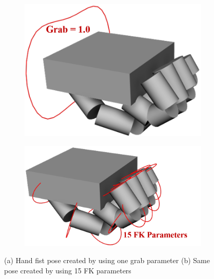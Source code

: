 \begin{figure}[!ht]
    \centering
    \begin{subfigure}[b]{0.2\textwidth}
        \includegraphics[width=\textwidth]{images/grab}
        \caption{}
        \label{}
    \end{subfigure}
    \begin{subfigure}[b]{0.23\textwidth}
        \includegraphics[width=\textwidth]{images/fk15}
        \caption{}
        \label{}
    \end{subfigure}
    
    
    \caption{(a) Hand fist pose created by using one grab parameter (b) Same pose created by using 15 FK parameters
    }
    \label{fig:handRigExample}
\end{figure}


